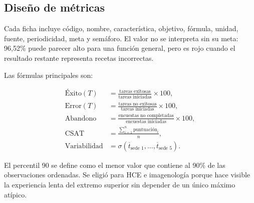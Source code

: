 \subsection{Diseño de métricas}


Cada ficha incluye código, nombre, característica, objetivo, fórmula, unidad, fuente, periodicidad, meta y semáforo. El valor no se interpreta sin su meta: 96,52\% puede parecer alto para una función general, pero es rojo cuando el resultado restante representa recetas incorrectas.

Las fórmulas principales son:

\begin{align}
\text{Éxito}(T) &= \frac{\text{tareas exitosas}}{\text{tareas iniciadas}}\times 100, \\
\text{Error}(T) &= \frac{\text{tareas no exitosas}}{\text{tareas iniciadas}}\times 100, \\
\text{Abandono} &= \frac{\text{encuestas no completadas}}{\text{encuestas iniciadas}}\times 100, \\
\text{CSAT} &= \frac{\sum_{i=1}^{n} \text{puntuación}_{i}}{n}, \\
\text{Variabilidad} &= \sigma\left(\overline{t}_{\text{sede }1},\ldots,\overline{t}_{\text{sede }5}\right).
\end{align}

El percentil 90 se define como el menor valor que contiene al 90\% de las observaciones ordenadas. Se eligió para HCE e imagenología porque hace visible la experiencia lenta del extremo superior sin depender de un único máximo atípico.


